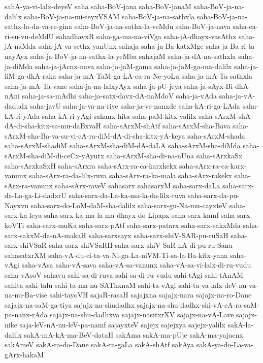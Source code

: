 {sahA-ya-vi-lalx-deyeV
saha
saha-BoV-jana
saha-BoV-janaM
saha-BoV-ja-na-dalilx
saha-BoV-ja-na-mi-teyxVSAM
saha-BoV-ja-na-sathxla
saha-BoV-ja-na-sathx-la-da-va-re-gina
saha-BoV-ja-na-sathx-la-veMdu
saha-BoV-ja-nava
saha-ca-ri-su-vu-deMdU
sahadhavxR
saha-ga-ma-na-viVga
saha-jA-dhayx-vasAthx
saha-jA-naMda
saha-jA-va-sethx-yanUnx
sahaja
saha-ja-Ba-katxMge
saha-ja-Ba-ri-ta-nayAyx
saha-ja-BoV-ja-na-sathx-la-yeMba
sahajaM
saha-ja-dA-na-sathxla
saha-ja-diMda
saha-ja-jAcnx-nava
saha-ja-jaM-gama
saha-ja-jaM-ga-ma-dalilx
saha-ja-liM-ga-dhA-raka
saha-ja-mA-TaM-ga-LA-ca-ra-Ne-yoLu
saha-ja-mA-Ta-sathxla
saha-ja-mA-Ta-vane
saha-ja-na-lalxyAyx
saha-ja-pU-jeya
saha-ja-sAyx-Bi-dhA-nAni
saha-ja-sa-mAdhi
saha-ja-satx-davx-dA-naMdoV
saha-ja-vAda
saha-ja-vA-dadudx
saha-javU
saha-ja-va-na-riye
saha-ja-ve-nanxde
saha-kA-ri-ga-LAda
saha-kA-ri-yAda
saha-kA-ri-yAgi
sahanx-hita
saha-paM-kitx-yalilx
saha-sArxM-shA-dA-di-sha-kitx-sa-mu-daBxvaH
saha-sArxM-shAtf
saha-sArxM-sha-Bava
saha-sArxM-sha-Ba-va-su-vi-cA-ra-diM-dA-di-sha-kitx-yA-keya
saha-sArxM-shada
saha-sArxM-shadiM
saha-sArxM-sha-diM-dA-daLA
saha-sArxM-sha-diMda
saha-sArxM-sha-diM-di-ceCx-yAyutx
saha-sArxM-sha-di-na-nUna
saha-sArxkaSx
saha-sArxkaSxH
saha-sArxra
saha-sArx-ra-ca-karxkekx
saha-sArx-ra-ca-karx-vanunx
saha-sArx-ra-da-lilx-ruva
saha-sArx-ra-ka-mala
saha-sArx-rakekx
saha-sArx-ra-vanunx
saha-sArx-raveV
sahasarx
sahasarxM
saha-sarx-daLa
saha-sarx-da-La-ga-Li-dadxrU
saha-sarx-da-La-ka-ma-la-da-lilx-ruva
saha-sarx-da-pu-Nayxvu
saha-sarx-do-LoM-daM-sha-dalilx
saha-sarx-gu-Na-mu-cayxteV
saha-sarx-ka-leya
saha-sarx-ka-ma-la-ma-dhayx-do-Lipapx
saha-sarx-kamf
saha-sarx-koVTi
saha-sarx-muKa
saha-sarx-pAtf
saha-sarx-patarx
saha-sarx-sakxMda
saha-sarx-sakxM-da-nA-makaH
saha-sarxsayx
saha-sarx-shiV-SAR-pu-ruSaH
saha-sarx-shiVSaR
saha-sarx-shiVSaRH
saha-sarx-shiV-SaR-nA-di-pu-ru-Sanu
sahasatxrXM
saha-vA-du-ci-ta-va-Ni-ga-La-niVM-Ti-sa-la-Ba-kitx-yana
saha-vAgi
saha-vAsa
saha-vA-sava
saha-vA-sa-vanunx
saha-vA-sa-vi-lalx-di-ru-vudu
saha-vAsoV
sahavu
sahi-sa-di-ruva
sahi-sa-di-ru-vudu
sahi-tAgi
sahi-tAnAM
sahita
sahi-talu
sahi-ta-ma-nu-SAThxnaM
sahi-ta-vAgi
sahi-ta-va-lalx-deV-nu-va-na-nu-Ba-vise
sahi-tayoVH
sajaR-rasaH
sajajxna
sajajx-nara
sajajx-na-ro-Dane
sajajx-na-saM-ga-tiya
sajajx-na-shudadhx
sajajx-na-shu-dadhx-shi-vA-cA-ra-saM-pa-nanx-rAda
sajajx-na-shu-dadhxva
sajajx-nasitxrXV
sajajx-na-vA-Lave
sajajx-nike
saja-leV-nA-nu-leV-pa-namf
sajayxteV
sajejx
sajejxya
sajejx-yalilx
sakA-la-dalilx
sakA-mA-kA-ma-BeV-dataH
sakAma
sakA-ma-pUje
sakA-ma-yajacnx
sakAmeV
sakA-ra-do-Dane
sakA-ra-gaLa
sakA-shAtf
sakAya
sakA-ya-do-La-va-gArx-hakaM
}
